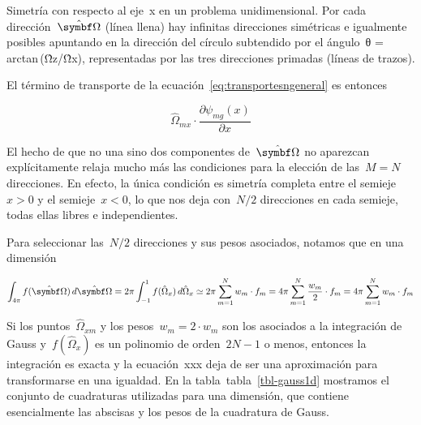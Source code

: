 \documentclass[
  12pt,
  a4paper,
  table]{scrbook}
\theoremstyle{plain}
\theoremstyle{definition}
\theoremstyle{plain}
\theoremstyle{plain}
\theoremstyle{remark}
\begin{document}
\protect\hypertarget{fig:symmetry1d}{}{}Simetría con respecto al eje~{x}
en un problema unidimensional. Por cada dirección~{\(\omegaversor\)}
(línea llena) hay infinitas direcciones simétricas e igualmente posibles
apuntando en la dirección del círculo subtendido por el
ángulo~{θ = arctan (Ω̂z/Ω̂x)}, representadas por las tres direcciones
primadas (líneas de trazos).

El término de transporte de la
ecuación~\protect\hyperlink{eq:transportesngeneral}{{[}eq:transportesngeneral{]}}
es entonces

\[\hat{\Omega}_{mx} \cdot \frac{\partial{\psi_{mg}}(x)}{\partial x}\]

El hecho de que no una sino dos componentes de~\(\omegaversor\) no
aparezcan explícitamente relaja mucho más las condiciones para la
elección de las~\(M=N\) direcciones. En efecto, la única condición es
simetría completa entre el semieje~\(x>0\) y el semieje~\(x<0\), lo que
nos deja con~\(N/2\) direcciones en cada semieje, todas ellas libres e
independientes.

Para seleccionar las~\(N/2\) direcciones y sus pesos asociados, notamos
que en una dimensión

\[\label{eq:1dgauss}
 \int_{4\pi} f(\omegaversor) \, d\omegaversor = 2\pi \int_{-1}^{1} f(\hat{\Omega}_x) \, d\hat{\Omega}_x \simeq 
2\pi \sum_{m=1}^N w_m \cdot f_m =
4\pi \sum_{m=1}^N \frac{w_m}{2} \cdot f_m =
4\pi \sum_{m=1}^N w_m \cdot f_m\]

Si los puntos~\(\hat{\Omega}_{xm}\) y los pesos~\(w_m=2\cdot w_m\) son
los asociados a la integración de Gauss y~\(f(\hat{\Omega}_x)\) es un
polinomio de orden~\(2N-1\) o menos, entonces la integración es exacta y
la ecuación~xxx deja de ser una aproximación para transformarse en una
igualdad. En la tabla~tabla~\ref{tbl-gauss1d} mostramos el conjunto de
cuadraturas utilizadas para una dimensión, que contiene esencialmente
las abscisas y los pesos de la cuadratura de Gauss.
\end{document}
